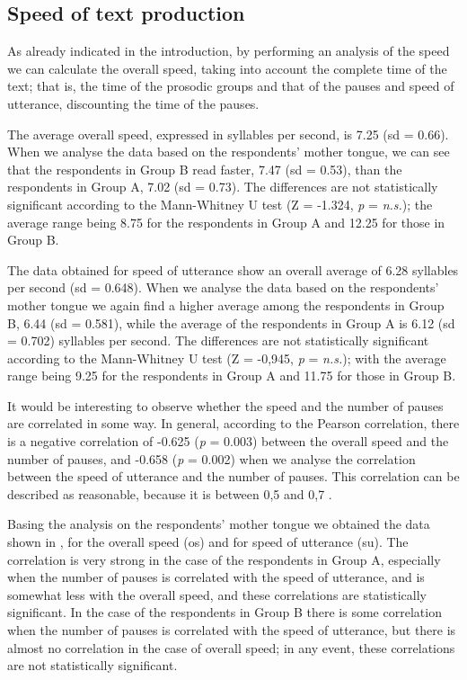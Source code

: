 \documentclass[output=paper]{langsci/langscibook}
\begin{document}
\subsection{Speed of text production}

  As already indicated in the introduction, by performing an analysis of the speed we can calculate the overall speed, taking into account the complete time of the text; that is, the time of the prosodic groups and that of the pauses and speed of utterance, discounting the time of the pauses.

  The average overall speed, expressed in syllables per second, is 7.25 (sd = 0.66). When we analyse the data based on the respondents’ mother tongue, we can see that the respondents in Group B read faster, 7.47 (sd = 0.53), than the respondents in Group A, 7.02 (sd = 0.73). The differences are not statistically significant according to the Mann-Whitney U test (Z = -1.324, \textit{p} = \textit{n.s.}); the average range being 8.75 for the respondents in Group A and 12.25 for those in Group B.

  The data obtained for speed of utterance show an overall average of 6.28 syllables per second (sd = 0.648). When we analyse the data based on the respondents’ mother tongue we again find a higher average among the respondents in Group B, 6.44 (sd = 0.581), while the average of the respondents in Group A is 6.12 (sd = 0.702) syllables per second. The differences are not statistically significant according to the Mann-Whitney U test (Z = -0,945, \textit{p} = \textit{n.s.}); with the average range being 9.25 for the respondents in Group A and 11.75 for those in Group B.

  It would be interesting to observe whether the speed and the number of pauses are correlated in some way. In general, according to the Pearson correlation, there is a negative correlation of -0.625 (\textit{p} = 0.003) between the overall speed and the number of pauses, and -0.658 (\textit{p} = 0.002) when we analyse the correlation between the speed of utterance and the number of pauses. This correlation can be described as reasonable, because it is between 0,5 and 0,7 \citep{HerreraSoler.2011}.

  Basing the analysis on the respondents’ mother tongue we obtained the data shown in , for the overall speed (os) and for speed of utterance (su). The correlation is very strong in the case of the respondents in Group A, especially when the number of pauses is correlated with the speed of utterance, and is somewhat less with the overall speed, and these correlations are statistically significant. In the case of the respondents in Group B there is some correlation when the number of pauses is correlated with the speed of utterance, but there is almost no correlation in the case of overall speed; in any event, these correlations are not statistically significant.  
\end{document}
